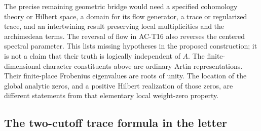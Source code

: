 The precise remaining geometric bridge would need a specified
cohomology theory or Hilbert space, a domain for its flow generator,
a trace or regularized trace, and an intertwining result preserving
local multiplicities and the archimedean terms.  The reversal of
flow in AC-T16 also reverses the centered spectral parameter.
This lists missing hypotheses in the proposed construction; it is
not a claim that their truth is logically independent of \(A\).
The finite-dimensional character constituents above are ordinary
Artin representations.  Their finite-place Frobenius eigenvalues
are roots of unity.  The location of the global analytic zeros,
and a positive Hilbert realization of those zeros, are different
statements from that elementary local weight-zero property.

\subsection{The two-cutoff trace formula in the letter}

